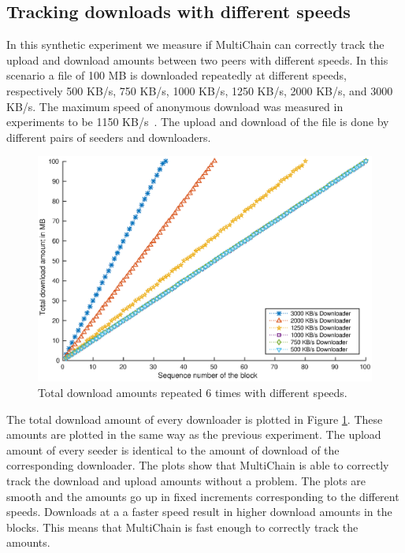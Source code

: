 \subsection{Tracking downloads with different speeds}
In this synthetic experiment we measure if MultiChain can correctly track the upload and download amounts
between two peers with different speeds.
In this scenario a file of 100 MB is downloaded repeatedly at different speeds,
respectively 500 KB/s, 750 KB/s, 1000 KB/s, 1250 KB/s, 2000 KB/s, and 3000 KB/s.
The maximum speed of anonymous download was measured in experiments to be 1150 KB/s~\cite{ruigrok-anonymous}.
The upload and download of the file is done by different pairs of seeders and downloaders.

\begin{figure}
\centerline{\includegraphics[scale=0.5]{experimentation/speeds/synthetic-simple-down.eps}}
\caption{Total download amounts repeated 6 times with different speeds.}
\label{fig:synthetic-simple-amounts}
\end{figure}

The total download amount of every downloader is plotted in Figure \ref{fig:synthetic-simple-amounts}.
These amounts are plotted in the same way as the previous experiment.
The upload amount of every seeder is identical to the amount of download of the corresponding downloader.
The plots show that MultiChain is able to correctly track the download and upload amounts without a problem.
The plots are smooth and the amounts go up in fixed increments corresponding to the different speeds.
Downloads at a a faster speed result in higher download amounts in the blocks.
This means that MultiChain is fast enough to correctly track the amounts.

